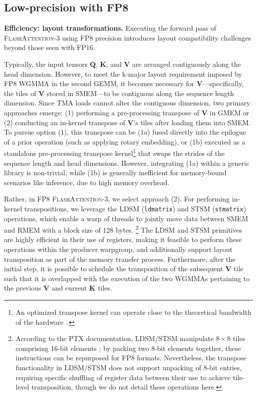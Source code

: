 \begin{enumerate}
\begin{algorithm}[H]
\begin{algorithmic}[1]
\subsection{Low-precision with FP8}
\label{sec:algofp8}

\textbf{Efficiency: layout transformations.} Executing the forward pass of \textsc{FlashAttention-3} using FP8 precision introduces layout compatibility challenges beyond those seen with FP16.

Typically, the input tensors $\mathbf{Q}$, $\mathbf{K}$, and $\mathbf{V}$ are arranged contiguously along the head dimension. However, to meet the k-major layout requirement imposed by FP8 WGMMA in the second GEMM, it becomes necessary for $\mathbf{V}$—specifically, the tiles of $\mathbf{V}$ stored in SMEM—to be contiguous along the sequence length dimension. Since TMA loads cannot alter the contiguous dimension, two primary approaches emerge: (1) performing a pre-processing transpose of $\mathbf{V}$ in GMEM or (2) conducting an in-kernel transpose of $\mathbf{V}$'s tiles after loading them into SMEM. To pursue option (1), this transpose can be (1a) fused directly into the epilogue of a prior operation (such as applying rotary embedding), or (1b) executed as a standalone pre-processing transpose kernel\footnote{An optimized transpose kernel can operate close to the theoretical bandwidth of the hardware~\citep{colfax_cutlass_transpose_2024}.} that swaps the strides of the sequence length and head dimensions. However, integrating (1a) within a generic library is non-trivial, while (1b) is generally inefficient for memory-bound scenarios like inference, due to high memory overhead.

Rather, in FP8 \textsc{FlashAttention-3}, we select approach (2). For performing in-kernel transpositions, we leverage the LDSM (\verb|ldmatrix|) and STSM (\verb|stmatrix|) operations, which enable a warp of threads to jointly move data between SMEM and RMEM with a block size of 128 bytes. \footnote{According to the PTX documentation, LDSM/STSM manipulate $8 \times 8$ tiles comprising 16-bit elements \cite[\S 9.7.13.4.15-16]{ptx}; by packing two 8-bit elements together, these instructions can be repurposed for FP8 formats. Nevertheless, the transpose functionality in LDSM/STSM does not support unpacking of 8-bit entries, requiring specific shuffling of register data between their use to achieve tile-level transposition, though we do not detail these operations here.} The LDSM and STSM primitives are highly efficient in their use of registers, making it feasible to perform these operations within the producer warpgroup, and additionally support layout transposition as part of the memory transfer process. Furthermore, after the initial step, it is possible to schedule the transposition of the subsequent $\mathbf{V}$ tile such that it is overlapped with the execution of the two WGMMAs pertaining to the previous $\mathbf{V}$ and current $\mathbf{K}$ tiles.


\end{algorithmic}
\end{algorithm}
\end{enumerate}
